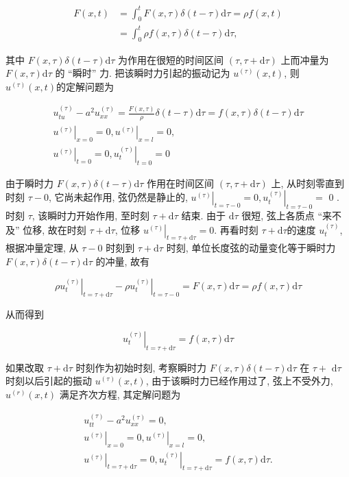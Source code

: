 $$
\begin{aligned}
F(x, t) & =\int_{0}^{t} F(x, \tau) \delta(t-\tau) \mathrm{d} \tau=\rho f(x, t) \\
& =\int_{0}^{t} \rho f(x, \tau) \delta(t-\tau) \mathrm{d} \tau,
\end{aligned}
$$

其中 $F(x, \tau) \delta(t-\tau) \mathrm{d} \tau$ 为作用在很短的时间区间 $(\tau, \tau+\mathrm{d} \tau)$ 上而冲量为 $F(x, \tau) \mathrm{d} \tau$ 的 “瞬时” 力. 把该瞬时力引起的振动记为 $u^{(\tau)}(x, t)$, 则 $u^{(\tau)}(x, t)$的定解问题为

$$
\begin{gathered}
u_{t u}^{(\tau)}-a^{2} u_{x x}^{(\tau)}=\frac{F(x, \tau)}{\rho} \delta(t-\tau) \mathrm{d} \tau=f(x, \tau) \delta(t-\tau) \mathrm{d} \tau \\
\left.u^{(\tau)}\right|_{x=0}=0,\left.u^{(\tau)}\right|_{x=l}=0, \\
\left.u^{(\tau)}\right|_{t=0}=0,\left.u_{t}^{(\tau)}\right|_{t=0}=0
\end{gathered}
$$

由于瞬时力 $F(x, \tau) \delta(t-\tau) \mathrm{d} \tau$ 作用在时间区间 $(\tau, \tau+\mathrm{d} \tau)$ 上, 从时刻零直到时刻 $\tau-0$, 它尚未起作用, 弦仍然是静止的, $\left.u^{(\tau)}\right|_{t=\tau-0}=0,\left.u_{t}^{(\tau)}\right|_{t=\tau-0}=$ 0 . 时刻 $\tau$, 该瞬时力开始作用, 至时刻 $\tau+\mathrm{d} \tau$ 结束. 由于 $\mathrm{d} \tau$ 很短, 弦上各质点 “来不及” 位移, 故在时刻 $\tau+\mathrm{d} \tau$, 位移 $\left.u^{(\tau)}\right|_{t=\tau+\mathrm{d} \tau}=0$. 再看时刻 $\tau+\mathrm{d} \tau$的速度 $u_{t}^{(\tau)}$, 根据冲量定理, 从 $\tau-0$ 时刻到 $\tau+\mathrm{d} \tau$ 时刻, 单位长度弦的动量变化等于瞬时力 $F(x, \tau) \delta(t-\tau) \mathrm{d} \tau$ 的冲量, 故有

$$
\left.\rho u_{t}^{(\tau)}\right|_{t=\tau+\mathrm{d} \tau}-\left.\rho u_{t}^{(\tau)}\right|_{t=\tau-0}=F(x, \tau) \mathrm{d} \tau=\rho f(x, \tau) \mathrm{d} \tau
$$

从而得到

$$
\left.u_{t}^{(\tau)}\right|_{t=\tau+\mathrm{d} \tau}=f(x, \tau) \mathrm{d} \tau
$$

如果改取 $\tau+\mathrm{d} \tau$ 时刻作为初始时刻, 考察瞬时力 $F(x, \tau) \delta(t-\tau) \mathrm{d} \tau$ 在 $\tau+$
$\mathrm{d} \tau$ 时刻以后引起的振动 $u^{(\tau)}(x, t)$, 由于该瞬时力已经作用过了, 弦上不受外力, $u^{(r)}(x, t)$ 满足齐次方程, 其定解问题为

$$
\begin{gathered}
u_{t t}^{(\tau)}-a^{2} u_{x x}^{(\tau)}=0, \\
\left.u^{(\tau)}\right|_{x=0}=0,\left.u^{(\tau)}\right|_{x=l}=0, \\
\left.u^{(\tau)}\right|_{t=\tau+\mathrm{d} \tau}=0,\left.u_{t}^{(\tau)}\right|_{t=\tau+\mathrm{d} \tau}=f(x, \tau) \mathrm{d} \tau .
\end{gathered}
$$


